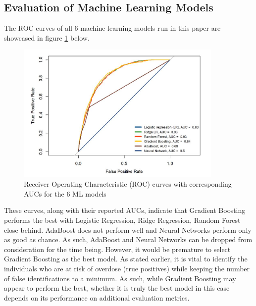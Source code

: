 \documentclass[twoside,10.5pt]{article}
\begin{document}
\subsection{Evaluation of Machine Learning Models}
The ROC curves of all 6 machine learning models run in this paper are showcased in figure \ref{fig:auc_curves} below.  

\begin{figure}[htp]
\centering
\includegraphics[width=10cm]{images/auc_curves.JPG}
\caption{Receiver Operating Characteristic (ROC) curves with corresponding AUCs for the 6 ML models}
\label{fig:auc_curves}
\end{figure}

These curves, along with their reported AUCs, indicate that Gradient Boosting performs the best with Logistic Regression, Ridge Regression, Random Forest close behind. AdaBoost does not perform well and Neural Networks perform only as good as chance. As such, AdaBoost and Neural Networks can be dropped from consideration for the time being. However, it would be premature to select Gradient Boosting as the best model. As stated earlier, it is vital to identify the individuals who are at risk of overdose (true positives) while keeping the number of false identifications to a minimum. As such, while Gradient Boosting may appear to perform the best, whether it is truly the best model in this case depends on its performance on additional evaluation metrics. 
\end{document}
